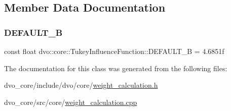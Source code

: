\subsection{Member Data Documentation}
\mbox{\label{classdvo_1_1core_1_1_tukey_influence_function_a4abcd23e283b3152de20aaf8eb092e26}} 
\subsubsection{\texorpdfstring{D\+E\+F\+A\+U\+L\+T\+\_\+B}{DEFAULT\_B}}
{\footnotesize\ttfamily const float dvo\+::core\+::\+Tukey\+Influence\+Function\+::\+D\+E\+F\+A\+U\+L\+T\+\_\+B = 4.\+6851f\hspace{0.3cm}{\ttfamily [static]}}



The documentation for this class was generated from the following files\+:\begin{DoxyCompactItemize}
\item 
dvo\+\_\+core/include/dvo/core/\mbox{\hyperlink{weight__calculation_8h}{weight\+\_\+calculation.\+h}}\item 
dvo\+\_\+core/src/core/\mbox{\hyperlink{weight__calculation_8cpp}{weight\+\_\+calculation.\+cpp}}\end{DoxyCompactItemize}
